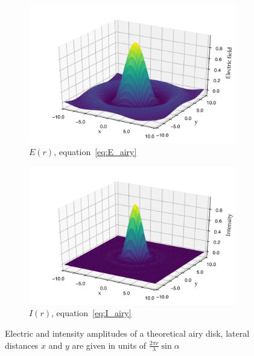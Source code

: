 \begin{figure}
    \centering
    \begin{subfigure}[b]{\textwidth}
        \includegraphics{+airy_E_fill}
        \caption{\(E(r)\), equation~\eqref{eq:E_airy}}\label{fig:airy_E_fill}
    \end{subfigure}\quad
    \begin{subfigure}[b]{\textwidth}
        \includegraphics{+airy_I_fill}
        \caption{\(I(r)\), equation~\eqref{eq:I_airy}}\label{fig:airy_I_fill}
    \end{subfigure}
    \caption[Electric and intensity amplitudes of a theoretical \gls{airy disk}]{Electric and intensity amplitudes of a theoretical \gls{airy disk}, lateral distances \(x\) and \(y\) are given in units of \(\frac{2\pi r }{\lambda}\sin {\alpha}\)}\label{fig:airy_disk}
\end{figure}

